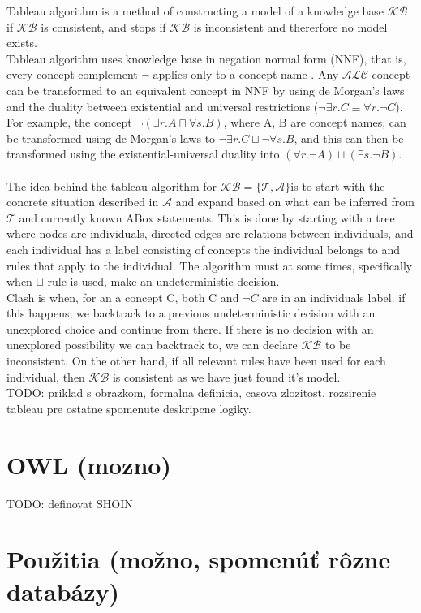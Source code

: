 Tableau algorithm is a method of constructing a model of a knowledge base $\mathcal{KB}$ if $\mathcal{KB}$ is consistent, and stops if $\mathcal{KB}$ is inconsistent and thererfore no model exists.\\
Tableau algorithm uses knowledge base in negation normal form (NNF), that is, every concept complement $\neg$ applies only to a concept name \cite{handbook2}.  Any $\mathcal{ALC}$ concept can be transformed to an equivalent concept in NNF by using de Morgan's laws and the duality between existential and universal restrictions ($\neg \exists r.C \equiv \forall r.{\neg C}$).
For example, the concept $\neg (\exists r.A \sqcap \forall s.B)$,
where A, B are concept names, can be transformed using de Morgan's laws to $\neg \exists r.C \sqcup \neg \forall s.B$, and this can then be transformed using the existential-universal duality into $(\forall r.\neg A) \sqcup (\exists s.\neg B)$.
\\ \\ 
The idea behind the tableau algorithm for $\mathcal{KB} = \{ \mathcal{T} , \mathcal{A} \} $is to start with the concrete situation described in $\mathcal{A}$ and expand based on what can be inferred from $\mathcal{T}$ and currently known ABox statements. This is done by starting with a tree where nodes are individuals, directed edges are relations between individuals, and each individual has a label consisting of concepts the individual belongs to and rules that apply to the individual. The algorithm must at some times, specifically when $\sqcup$  rule is used, make an undeterministic decision.
\\
Clash is when, for an a concept C, both C and $\neg C$ are in an individuals label. if this happens, we backtrack to a previous undeterministic decision with an unexplored choice and continue from there.    
If there is no decision with an unexplored possibility we can backtrack to, we can declare $\mathcal{KB}$ to be inconsistent. On the other hand, if all relevant rules have been used for each individual, then $\mathcal{KB}$ is consistent as we have just found it's model. \\
 TODO: priklad s obrazkom, formalna definicia, casova zlozitost, rozsirenie tableau pre ostatne spomenute deskripcne logiky.



\section{OWL (mozno)}
	TODO: definovat SHOIN
\section{Použitia  (možno, spomenúť rôzne databázy)}

